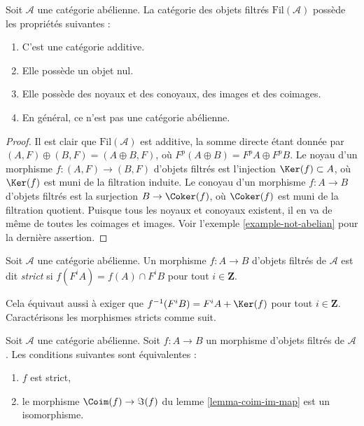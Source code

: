 \begin{lemma}
\label{lemma-filtered}
Soit $\mathcal{A}$ une catégorie abélienne.
La catégorie des objets filtrés $\text{Fil}(\mathcal{A})$
possède les propriétés suivantes :
\begin{enumerate}
\item C'est une catégorie additive.
\item Elle possède un objet nul.
\item Elle possède des noyaux et des conoyaux, des images et des coimages.
\item En général, ce n'est pas une catégorie abélienne.
\end{enumerate}
\end{lemma}

\begin{proof}
Il est clair que $\text{Fil}(\mathcal{A})$ est additive, la somme
directe étant donnée par $(A, F) \oplus (B, F) = (A \oplus B, F)$, où
$F^p(A \oplus B) = F^pA \oplus F^pB$.
Le noyau d'un morphisme $f : (A, F) \to (B, F)$ d'objets
filtrés est l'injection $\Ker(f) \subset A$, où $\Ker(f)$
est muni de la filtration induite.
Le conoyau d'un morphisme $f : A \to B$ d'objets
filtrés est la surjection $B \to \Coker(f)$, où $\Coker(f)$
est muni de la filtration quotient. Puisque tous les noyaux et conoyaux
existent, il en va de même de toutes les coimages et images. Voir
l'exemple \ref{example-not-abelian}
pour la dernière assertion.
\end{proof}

\begin{definition}
\label{definition-strict}
Soit $\mathcal{A}$ une catégorie abélienne.
Un morphisme $f : A \to B$ d'objets filtrés de $\mathcal{A}$ est
dit {\it strict} si $f(F^iA) = f(A) \cap F^iB$ pour
tout $i \in \mathbf{Z}$.
\end{definition}

\noindent
Cela équivaut aussi à exiger que $f^{-1}(F^iB) = F^iA + \Ker(f)$
pour tout $i \in \mathbf{Z}$. Caractérisons les morphismes stricts
comme suit.

\begin{lemma}
\label{lemma-characterize-strict-general}
Soit $\mathcal{A}$ une catégorie abélienne.
Soit $f : A \to B$ un morphisme d'objets filtrés de $\mathcal{A}$.
Les conditions suivantes sont équivalentes :
\begin{enumerate}
\item $f$ est strict,
\item le morphisme $\Coim(f) \to \Im(f)$ du
lemme \ref{lemma-coim-im-map}
est un isomorphisme.
\end{enumerate}
\end{lemma}

